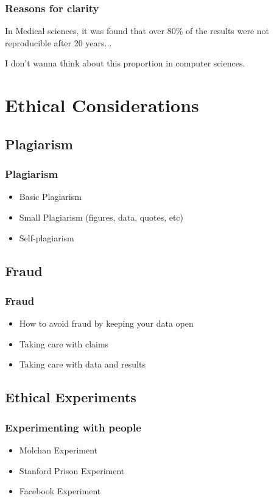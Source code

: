 \documentclass[10pt]{beamer}
\begin{document}
\begin{frame}
  \frametitle{Reasons for clarity}

  In Medical sciences, it was found that over 80\% of the results were
  not reproducible after 20 years...
  
  \bigskip

  I don't wanna think about this proportion in computer sciences.
\end{frame}

\section{Ethical Considerations}
\subsection{Plagiarism}
\begin{frame}
  \frametitle{Plagiarism}
  \begin{itemize}
    \item Basic Plagiarism
    \item Small Plagiarism (figures, data, quotes, etc)
    \item Self-plagiarism
  \end{itemize}
\end{frame}

\subsection{Fraud}
\begin{frame}
  \frametitle{Fraud}
  \begin{itemize}
    \item How to avoid fraud by keeping your data open
    \item Taking care with claims
    \item Taking care with data and results
  \end{itemize}
\end{frame}

\subsection{Ethical Experiments}
\begin{frame}
  \frametitle{Experimenting with people}
  \begin{itemize}
    \item Molchan Experiment
    \item Stanford Prison Experiment
    \item Facebook Experiment
  \end{itemize}
\end{frame}
\end{document}
